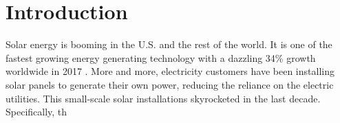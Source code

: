 \documentclass[msom,blindrev]{informs3}
\begin{document}
%


\section{Introduction}

Solar energy is booming in the U.S. and the rest of the world. It is one of the fastest growing energy generating technology with a dazzling 34\% growth worldwide in 2017 \citep{iea2018snapshot}. More and more, electricity customers have been installing solar panels to generate their own power, reducing the reliance on the electric utilities. This small-scale solar installations skyrocketed in the last decade. Specifically, th
\end{document}
